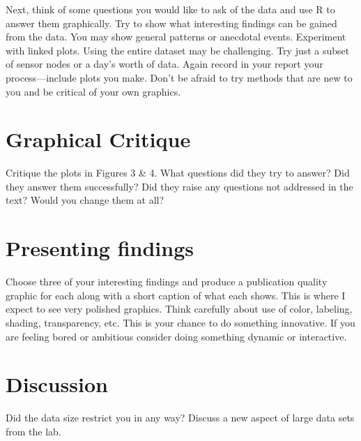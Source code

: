 \documentclass[11pt, oneside]{article}   	%
\begin{document}
Next, think of some questions you would like to ask of the data and use R to
answer them graphically. Try to show what interesting findings can be gained
from the data. You may show general patterns or anecdotal events. Experiment
with linked plots. Using the entire dataset may be challenging. Try just a
subset of sensor nodes or a day's worth of data. Again record in your report
your process---include plots you make. Don't be afraid to try methods that are
new to you and be critical of your own graphics.

\section{Graphical Critique}

Critique the plots in Figures 3 \& 4. What questions did they try to answer?
Did they answer them successfully? Did they raise any questions not addressed
in the text? Would you change them at all?


\section{Presenting findings}

Choose three of your interesting findings and produce a publication quality
graphic for each along with a short caption of what each shows. This is where I
expect to see very polished graphics. Think carefully about use of color,
labeling, shading, transparency, etc. This is your chance to do something
innovative. If you are feeling bored or ambitious consider doing something
dynamic or interactive.


\section{Discussion}

Did the data size restrict you in any way? Discuss a new aspect of large data
sets from the lab.
\end{document}
